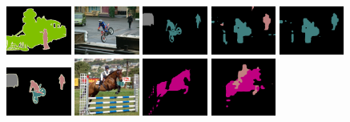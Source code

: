 \begin{figure}
  {\includegraphics[width=0.19\textwidth]{Images/analysis/2007_002565.png}}
  {\includegraphics[width=0.19\textwidth]{Images/analysis/0086.jpg}}
  {\includegraphics[width=0.19\textwidth]{Images/analysis/86.png}}
  {\includegraphics[width=0.19\textwidth]{Images/analysis/colored_mask_gi_val86.png}}
  {\includegraphics[width=0.19\textwidth]{Images/analysis/originalcheckpoint/0086.png}}
  {\includegraphics[width=0.19\textwidth]{Images/analysis/2007_002643.png}}
  {\includegraphics[width=0.19\textwidth]{Images/analysis/0262.jpg}}
  {\includegraphics[width=0.19\textwidth]{Images/analysis/262.png}}
  {\includegraphics[width=0.19\textwidth]{Images/analysis/colored_mask_gi_val262.png}}

\end{figure}
